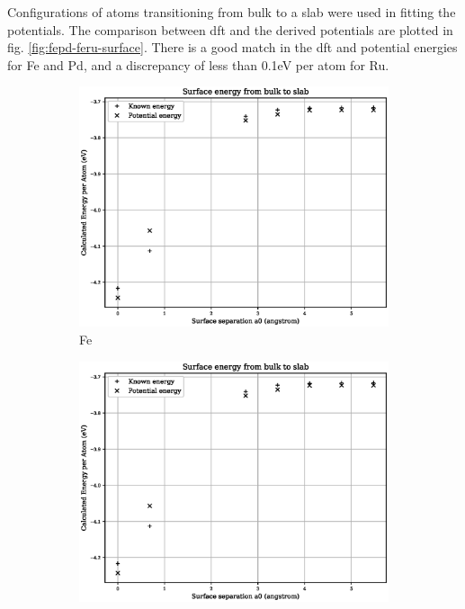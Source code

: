 Configurations of atoms transitioning from bulk to a slab were used in fitting the potentials.  The comparison between \acrshort{dft} and the derived potentials are plotted in fig. \ref{fig:fepd-feru-surface}. There is a good match in the \acrshort{dft} and potential energies for \Gls{Fe} and \Gls{Pd}, and a discrepancy of less than 0.1eV per atom for \Gls{Ru}.

\begin{figure}[htb]
\begin{subfigure}{.48\textwidth}
  \centering
  \includegraphics[width=.94\linewidth]{chapters/potentials_fe_pd_ru/fepd_potential/fe_surface_energy.eps} 
  \caption{Fe}
  \label{fig:fepd-fe-surface}
\end{subfigure}
\begin{subfigure}{.48\textwidth}
  \centering
  \includegraphics[width=.94\linewidth]{chapters/potentials_fe_pd_ru/fepd_potential/pd_surface_energy.eps} 

\end{subfigure}
\end{figure}
